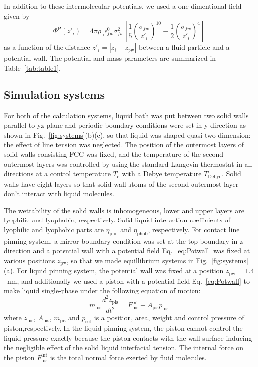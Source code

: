 In addition to these intermolecular potentials, we used a one-dimentional field given by
\begin{equation}
\label{eq:Potwall}
\Phi^\mathrm{P}(z'_{i})=
4\pi\rho_{\text{n}}\epsilon^{0}_{fw}\sigma_{fw}^{2}\left[
\frac{1}{5}\left( \frac{\sigma_{fw}}{z'_{i}}\right)^{10}
-\frac{1}{2}\left( \frac{\sigma_{fw}}{z'_{i}}\right)^{4}
\right]
\end{equation}
as a function of the distance $z'_{i}=|z_{i}-z_{\text{pw}}|$
between a fluid particle and a potential wall.
The potential and mass parameters are summarized in Table~\ref{tab:table1}.

\subsection{Simulation systems}
For both of the calculation systems, liquid bath was put between two solid walls parallel to yz-plane and
periodic boundary conditions were set in y-direction as shown in Fig.~\ref{fig:systems}(b)(c),
so that liquid was shaped quasi two dimension: the effect of line tension was neglected.
The position of the outermost layers of solid walls consisting FCC was fixed, 
and the temperature of the second outermost layers was controlled 
by using the standard Langevin thermostat in all directions at a control temperature $T_{\text{c}}$
with a Debye temperature $T_{\text{Debye}}$.
Solid walls have eight layers 
so that solid wall atoms of  the second outermost layer don't interact with liquid molecules.

The wettability of the solid walls is inhomogeneous, lower and upper layers are lyophilic and lyophobic, respectively.
Solid liquid interaction coefficients of lyophilic and lyophobic parts are $\eta_{\text{phil}}$ and $\eta_{\text{phob}}$, respectively.
For contact line pinning system, a mirror boundary condition was set at the top boundary in z-direction
and a potential wall with a potential field Eq.~\eqref{eq:Potwall} was fixed at various positions $z_{\text{pw}}$,
so that we made equillibrium systems in Fig.~\ref{fig:systems}(a).
For liquid pinning system, the potential wall was fixed at a position $z_{\text{pw}}=1.4$~nm,
and additionally we used a piston with a potential field Eq.~\eqref{eq:Potwall} to make liquid single-phase 
under the following equation of motion:
\begin{equation}
m_{\text{pis}}\frac{d^{2} z_{\text{pis}}}{dt^{2}}=F_{\text{pis}}^{\text{int}}-A_{\text{pis}}p_{\text{pis}}
\end{equation}
where $z_{\text{pis}}$, $A_{\text{pis}}$, $m_{\text{pis}}$ and $p_{\text{set}}$ 
is a position, area, weight and control pressure of piston,respectively.
In the liquid pinning system, the piston cannot control the liquid pressure exactly
because the piston contacts with the wall surface inducing the negligible effect of the solid liquid interfacial tension.
The internal force on the piston $F_{\text{pis}}^{\text{int}}$ is the total normal force exerted by fluid molecules.

